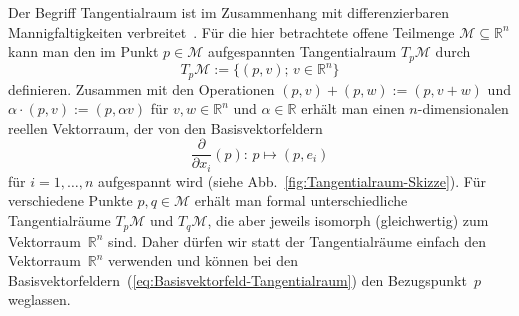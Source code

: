 \begin{remark}
[Tangentialraum]\label{rem:tangentialraum}Der Begriff Tangentialraum
ist im Zusammenhang mit differenzierbaren Mannigfaltigkeiten verbreitet~\cite{abraham1983,jaenich2005,lee2006}.
Für die hier betrachtete offene Teilmenge $\mathcal{M}\subseteq{\mathbb{R}}^{n}$
kann man den im Punkt $p\in\mathcal{M}$ aufgespannten Tangentialraum
$T_{p}\mathcal{M}$ durch
\[
T_{p}\mathcal{M}:=\{(p,v);\,v\in{\mathbb{R}}^{n}\}
\]
definieren.
Zusammen mit den Operationen $(p,v)+(p,w):=(p,v+w)$ und
$\alpha\cdot(p,v):=(p,\alpha v)$ für $v,w\in{\mathbb{R}}^{n}$ und $\alpha\in{\mathbb{R}}$
erhält man einen $n$-dimensionalen reellen Vektorraum, der von den
Basisvektorfeldern
\begin{equation}
\frac{\partial}{\partial x_{i}}(p):\,p\mapsto(p,e_{i})\label{eq:Basisvektorfeld-Tangentialraum}
\end{equation}
für $i=1,\ldots,n$ aufgespannt wird (siehe Abb.~\ref{fig:Tangentialraum-Skizze}).
Für verschiedene Punkte $p,q\in\mathcal{M}$ erhält man formal unterschiedliche
Tangentialräume $T_{p}\mathcal{M}$ und $T_{q}\mathcal{M}$, die aber
jeweils isomorph (gleichwertig) zum Vektorraum~${\mathbb{R}}^{n}$ sind. Daher
dürfen wir statt der Tangentialräume einfach den Vektor\-raum~${\mathbb{R}}^{n}$
verwenden und können bei den Basisvektorfeldern~(\ref{eq:Basisvektorfeld-Tangentialraum})
den Bezugspunkt~$p$ weglassen.
\end{remark}

